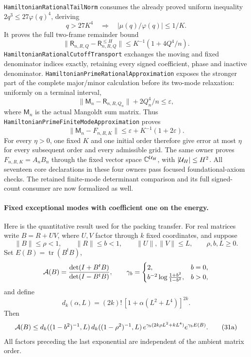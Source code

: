 \texttt{HamiltonianRationalTailNorm} consumes the already proved
uniform inequality \(2q^3\leq27\varphi(q)^4\), deriving
\[
 q>27K^4\quad\Longrightarrow\quad
 |\mu(q)/\varphi(q)|\leq1/K.
\]
It proves the full two-frame remainder bound
\[
 \|\mathsf R_{n,R,Q}-\mathsf R_{n,R,Q}^{\leq H}\|
 \leq K^{-1}(1+4Q^4/n).
\]
\texttt{HamiltonianRationalCutoffTransport} exchanges the moving
and fixed denominator indices exactly, retaining every signed
coefficient, phase and inactive denominator.
\texttt{HamiltonianPrimeRationalApproximation} exposes the
stronger part of the complete major/minor calculation before
its two-mode relaxation: uniformly on a terminal interval,
\[
 \|\mathsf M_n-\mathsf R_{n,R,Q_n}\|+2Q_n^4/n
                                                    \leq\varepsilon,
\]
where \(\mathsf M_n\) is the actual Mangoldt sum matrix.
Thus \texttt{HamiltonianPrimeFiniteModeApproximation} proves
\[
 \|\mathsf M_n-F_{n,R,K}\|
       \leq\varepsilon+K^{-1}(1+2\varepsilon).
\]
For every \(\eta>0\), one fixed \(K\) and one initial order
therefore give error at most \(\eta\) for every subsequent
order and every admissible grid.
The same owner proves \(F_{n,R,K}=A_nB_n\) through the
fixed vector space \(\mathbb C^{{\cal U}_H}\), with
\(|{\cal U}_H|\leq H^2\).
All seventeen core declarations in these four owners pass
focused foundational-axiom checks.
The retained finite-mode determinant comparison and its full
signed-count consumer are now formalized as well.

\paragraph{Fixed exceptional modes with coefficient one on the energy.}
Here is the quantitative result used for the packing transfer.
For real matrices write \(B=R+UV\), where \(U,V\) factor
through \(k\) fixed coordinates, and suppose
\[
 \|B\|\leq\rho<1,\qquad \|R\|\leq b<1,\qquad
 \|U\|,\|V\|\leq L,\qquad \rho,b,L\geq0.
\]
Set \(E(B)=\operatorname{tr}(B^tB)\),
\[
 {\cal A}(B)=\frac{\det(I+B^tB)}{\det(I-B^tB)},\qquad
 \gamma_b=\begin{cases}
 2,&b=0,\\
 b^{-2}\log\frac{1+b^2}{1-b^2},&b>0,
 \end{cases}
\]
and define
\[
 d_k(\alpha,L)=(2k)!\,[1+\alpha(L^2+L^4)]^{2k}.
\]
Then
\[
 {\cal A}(B)\leq
 d_k((1-b^2)^{-1},L)\,
 d_k((1-\rho^2)^{-1},L)\,
 e^{\gamma_b(2k\rho L^2+kL^4)}
 e^{\gamma_b E(B)}.                                  \tag{31a}
\]
All factors preceding the last exponential are independent
of the ambient matrix order.

